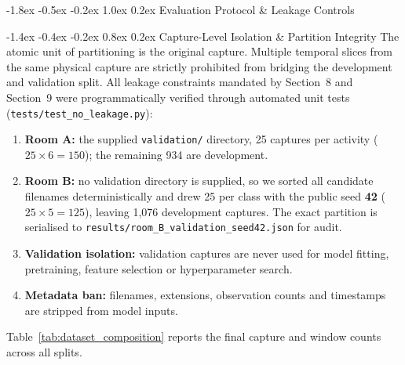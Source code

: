 \documentclass[10pt,a4paper]{article}
\makeatletter
\renewcommand{\section}{\@startsection{section}{1}{\z@}%
  {-1.8ex \@plus -0.5ex \@minus -0.2ex}%
  {1.0ex \@plus 0.2ex}%
  {\normalfont\large\bfseries\color{primary}}}
\renewcommand{\subsection}{\@startsection{subsection}{2}{\z@}%
  {-1.4ex \@plus -0.4ex \@minus -0.2ex}%
  {0.8ex \@plus 0.2ex}%
  {\normalfont\normalsize\bfseries\color{secondary}}}
\makeatother
\begin{document}
\section{Evaluation Protocol \& Leakage Controls}

\subsection{Capture-Level Isolation \& Partition Integrity}
The atomic unit of partitioning is the original capture. Multiple temporal slices from the same physical capture are strictly prohibited from bridging the development and validation split. All leakage constraints mandated by Section~8 and Section~9 were programmatically verified through automated unit tests (\texttt{tests/test\_no\_leakage.py}):
\begin{enumerate}
    \item \textbf{Room A:} the supplied \texttt{validation/} directory, 25 captures per activity ($25\times6=150$); the remaining 934 are development.
    \item \textbf{Room B:} no validation directory is supplied, so we sorted all candidate filenames deterministically and drew 25 per class with the public seed \textbf{42} ($25\times5=125$), leaving 1,076 development captures. The exact partition is serialised to \texttt{results/room\_B\_validation\_seed42.json} for audit.
    \item \textbf{Validation isolation:} validation captures are never used for model fitting, pretraining, feature selection or hyperparameter search.
    \item \textbf{Metadata ban:} filenames, extensions, observation counts and timestamps are stripped from model inputs.
\end{enumerate}
Table~\ref{tab:dataset_composition} reports the final capture and window counts across all splits.
\end{document}
